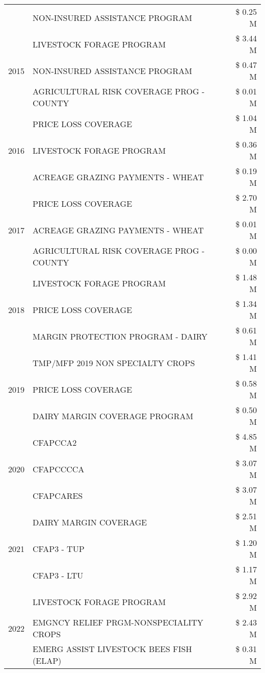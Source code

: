 \begin{tabular}{llr}
 & NON-INSURED ASSISTANCE PROGRAM & \$ 0.25 M \\
\cline{1-3}
\multirow[t]{3}{*}{2015} & LIVESTOCK FORAGE PROGRAM & \$ 3.44 M \\
 & NON-INSURED ASSISTANCE PROGRAM & \$ 0.47 M \\
 & AGRICULTURAL RISK COVERAGE PROG - COUNTY & \$ 0.01 M \\
\cline{1-3}
\multirow[t]{3}{*}{2016} & PRICE LOSS COVERAGE & \$ 1.04 M \\
 & LIVESTOCK FORAGE PROGRAM & \$ 0.36 M \\
 & ACREAGE GRAZING PAYMENTS - WHEAT & \$ 0.19 M \\
\cline{1-3}
\multirow[t]{3}{*}{2017} & PRICE LOSS COVERAGE & \$ 2.70 M \\
 & ACREAGE GRAZING PAYMENTS - WHEAT & \$ 0.01 M \\
 & AGRICULTURAL RISK COVERAGE PROG - COUNTY & \$ 0.00 M \\
\cline{1-3}
\multirow[t]{3}{*}{2018} & LIVESTOCK FORAGE PROGRAM & \$ 1.48 M \\
 & PRICE LOSS COVERAGE & \$ 1.34 M \\
 & MARGIN PROTECTION PROGRAM - DAIRY & \$ 0.61 M \\
\cline{1-3}
\multirow[t]{3}{*}{2019} & TMP/MFP 2019 NON SPECIALTY CROPS & \$ 1.41 M \\
 & PRICE LOSS COVERAGE & \$ 0.58 M \\
 & DAIRY MARGIN COVERAGE PROGRAM & \$ 0.50 M \\
\cline{1-3}
\multirow[t]{3}{*}{2020} & CFAPCCA2 & \$ 4.85 M \\
 & CFAPCCCCA & \$ 3.07 M \\
 & CFAPCARES & \$ 3.07 M \\
\cline{1-3}
\multirow[t]{3}{*}{2021} & DAIRY MARGIN COVERAGE & \$ 2.51 M \\
 & CFAP3 - TUP & \$ 1.20 M \\
 & CFAP3 - LTU & \$ 1.17 M \\
\cline{1-3}
\multirow[t]{3}{*}{2022} & LIVESTOCK FORAGE PROGRAM & \$ 2.92 M \\
 & EMGNCY RELIEF PRGM-NONSPECIALITY CROPS & \$ 2.43 M \\
 & EMERG ASSIST LIVESTOCK BEES FISH (ELAP) & \$ 0.31 M \\
\cline{1-3}
\bottomrule
\end{tabular}
